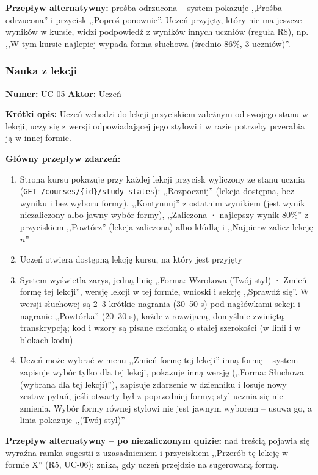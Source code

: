 \textbf{Przepływ alternatywny:} prośba odrzucona -- system pokazuje ,,Prośba odrzucona'' i przycisk ,,Poproś ponownie''. Uczeń przyjęty, który nie ma jeszcze wyników w kursie, widzi podpowiedź z wyników innych uczniów (reguła R8), np. ,,W tym kursie najlepiej wypada forma słuchowa (średnio 86\%, 3 uczniów)''.

\subsubsection{Nauka z lekcji}
\textbf{Numer:} UC-05 \quad \textbf{Aktor:} Uczeń

\textbf{Krótki opis:} Uczeń wchodzi do lekcji przyciskiem zależnym od swojego stanu w lekcji, uczy się z wersji odpowiadającej jego stylowi i w razie potrzeby przerabia ją w innej formie.

\textbf{Główny przepływ zdarzeń:}
\begin{enumerate}[leftmargin=*]
    \item Strona kursu pokazuje przy każdej lekcji przycisk wyliczony ze stanu ucznia (\texttt{GET /courses/\{id\}/study-states}): ,,Rozpocznij'' (lekcja dostępna, bez wyniku i bez wyboru formy), ,,Kontynuuj'' z ostatnim wynikiem (jest wynik niezaliczony albo jawny wybór formy), ,,Zaliczona · najlepszy wynik 80\%'' z przyciskiem ,,Powtórz'' (lekcja zaliczona) albo kłódkę i ,,Najpierw zalicz lekcję $n$''
    \item Uczeń otwiera dostępną lekcję kursu, na który jest przyjęty
    \item System wyświetla zarys, jedną linię ,,Forma: Wzrokowa (Twój styl) · Zmień formę tej lekcji'', wersję lekcji w tej formie, wnioski i sekcję ,,Sprawdź się''. W wersji słuchowej są 2--3 krótkie nagrania (30--50 s) pod nagłówkami sekcji i nagranie ,,Powtórka'' (20--30 s), każde z rozwijaną, domyślnie zwiniętą transkrypcją; kod i wzory są pisane czcionką o stałej szerokości (w linii i w blokach kodu)
    \item Uczeń może wybrać w menu ,,Zmień formę tej lekcji'' inną formę -- system zapisuje wybór tylko dla tej lekcji, pokazuje inną wersję (,,Forma: Słuchowa (wybrana dla tej lekcji)''), zapisuje zdarzenie w dzienniku i losuje nowy zestaw pytań, jeśli otwarty był z poprzedniej formy; styl ucznia się nie zmienia. Wybór formy równej stylowi nie jest jawnym wyborem -- usuwa go, a linia pokazuje ,,(Twój styl)''
\end{enumerate}

\textbf{Przepływ alternatywny -- po niezaliczonym quizie:} nad treścią pojawia się wyraźna ramka sugestii z uzasadnieniem i przyciskiem ,,Przerób tę lekcję w formie X'' (R5, UC-06); znika, gdy uczeń przejdzie na sugerowaną formę.

